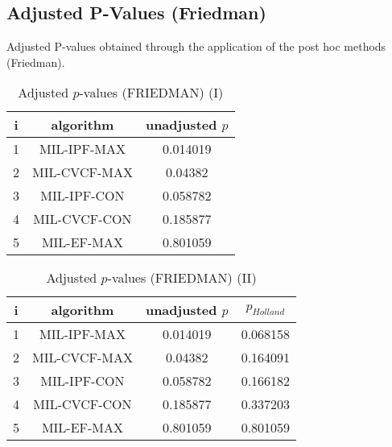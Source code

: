 \documentclass[a4paper,10pt]{article}
\begin{document}
\begin{landscape}
\newpage

\section{Adjusted P-Values (Friedman)}


Adjusted P-values obtained through the application of the post hoc methods (Friedman).

\begin{table}[!htp]
\centering\small
\begin{tabular}{ccc}
i&algorithm&unadjusted $p$\\
\hline1&MIL-IPF-MAX&0.014019\\2&MIL-CVCF-MAX&0.04382\\3&MIL-IPF-CON&0.058782\\4&MIL-CVCF-CON&0.185877\\5&MIL-EF-MAX&0.801059\\\hline
\end{tabular}
\caption{Adjusted $p$-values (FRIEDMAN) (I)}
\end{table}
\begin{table}[!htp]
\centering\small
\begin{tabular}{cccc}
i&algorithm&unadjusted $p$&$p_{Holland}$\\
\hline1&MIL-IPF-MAX&0.014019&0.068158\\2&MIL-CVCF-MAX&0.04382&0.164091\\3&MIL-IPF-CON&0.058782&0.166182\\4&MIL-CVCF-CON&0.185877&0.337203\\5&MIL-EF-MAX&0.801059&0.801059\\\hline
\end{tabular}
\caption{Adjusted $p$-values (FRIEDMAN) (II)}
\end{table}

\newpage
\end{landscape}
\end{document}
